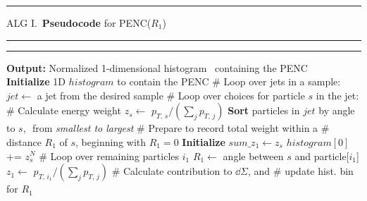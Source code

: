 \vspace{15pt}



\begin{table}%
\hspace{-60pt}
\begin{minipage}{0.58\textwidth}
\hrule height 1.3pt
\vspace{4pt}
{
    \hypertarget{alg:penc}{ALG I.}\,
    \textbf{Pseudocode} for PENC($R_1$)
}
\vspace{4pt}
\hrule
\hrule
\vspace{5pt}
\begin{algorithmic}[1]
    \State \textbf{Output:} Normalized 1-dimensional histogram
    \State \qquad\qquad\,{}
    containing the PENC
    \\
    \State
    \textbf{Initialize} 1D $histogram$ to contain the PENC
    \State \textcolor{codegreen!80!black}{\# Loop over jets in a sample:}
        \State $jet \gets$ a jet from the desired sample
        \State \textcolor{codegreen!80!black}{\# Loop over choices for particle $s$ in the jet:}
            \State \textcolor{codegreen!80!black}{\# Calculate energy weight}
            \State $z_s \gets $ \(p_{T,\, s}/(\sum_j p_{T,\,j})\)
            \State \textbf{Sort} particles in $jet$ by angle to $s$,
            \State
            \qquad\,\,from \textit{smallest to largest}
            \State \textcolor{codegreen!80!black}{\# Prepare to record total weight within a}
            \State \textcolor{codegreen!80!black}{\# distance \(R_1\) of \(s\), beginning with \(R_1=0\)}
            \State \textbf{Initialize} $sum\_z_1 \gets z_s$
                \State
                $histogram[0]$
                +=
                $z_s^N$
            \State \textcolor{codegreen!80!black}{\# Loop over remaining particles $i_1$}
                \State $R_1 \gets$ angle between $s$ and particle[$i_1$]
                \State $z_1 \gets $ \(p_{T,\, i_1}/(\sum_j p_{T,\,j})\)
                \State \textcolor{codegreen!80!black}{\# Calculate contribution to $\dd\Sigma$, and}
                \State \textcolor{codegreen!80!black}{\# update hist. bin for $R_1$}

\end{algorithmic}
\end{minipage}
\end{table}
